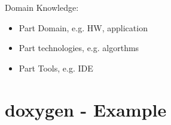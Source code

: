 \documentclass[12pt,a4paper]{scrbook}
\begin{document}
Domain Knowledge:

\begin{itemize}
    \item Part Domain, e.g. HW, application
    \item Part technologies, e.g. algorthms
    \item Part Tools, e.g. IDE
\end{itemize}


\chapter{doxygen - Example}

\cleardoublepage
{}
\printbibliography


\cleardoublepage

\printindex
\end{document}
